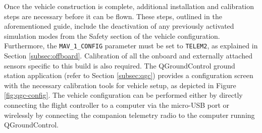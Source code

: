 Once the vehicle construction is complete, additional installation and calibration steps are necessary before it can be flown. These steps, outlined in the aforementioned guide, include the deactivation of any previously activated simulation modes from the Safety section of the vehicle configuration. Furthermore, the \texttt{MAV_1_CONFIG} parameter must be set to \texttt{TELEM2}, as explained in Section \ref{subsec:offboard}. Calibration of all the onboard and externally attached sensors specific to this build is also required. The QGroundControl ground station application (refer to Section \ref{subsec:qgc}) provides a configuration screen with the necessary calibration tools for vehicle setup, as depicted in Figure \ref{fig:qgc-config}. The vehicle configuration can be performed either by directly connecting the flight controller to a computer via the micro-USB port or wirelessly by connecting the companion telemetry radio to the computer running QGroundControl.


